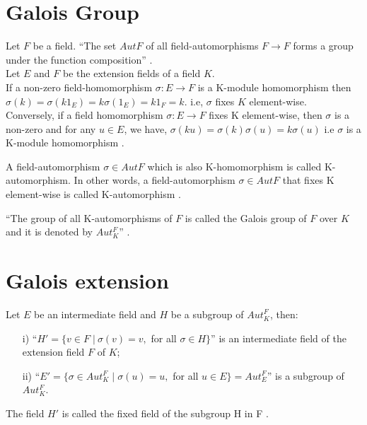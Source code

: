 \section{Galois Group}
Let \(F\) be a field. ``The set \(AutF\) of all field-automorphisms \(F \rightarrow F \) forms a group under the function composition'' \cite{hunger}.\\[3mm]
\noindent
Let \(E\) and \(F\) be the extension fields of a field \(K\).\\
If a non-zero field-homomorphism \(\sigma : E \rightarrow F\) is a K-module homomorphism then\\
\(\sigma(k)=\sigma(k1_E)=k\sigma(1_E)=k1_F=k\).\hspace{7mm}
i.e, \(\sigma\) fixes \(K\) element-wise.\\
Conversely, if a field homomorphism \(\sigma : E \rightarrow F\) fixes K element-wise, then \(\sigma\) is a non-zero and for any \(u \in E\), we have, \(\sigma(ku)=\sigma(k)\sigma(u)=k\sigma(u)\)
i.e \(\sigma\) is a K-module homomorphism \cite{hunger}.
\begin{definition}
  A field-automorphism \(\sigma \in Aut F\) which is also K-homomorphism is called K-automorphism. In other words, a field-automorphism \(\sigma \in Aut F\) that fixes K element-wise is called K-automorphism \cite{hunger}.
\end{definition}

\begin{definition}
  ``The group of all K-automorphisms of \(F\) is called the Galois group of \(F\) over \(K\) and it is denoted by \(Aut_K^F\)'' \cite{hunger}.
\end{definition}

\section{Galois extension}
Let \(E\) be an intermediate field and \(H\) be a subgroup of \(Aut_K^F\), then:
\begin{enumerate}
\item[i)] ``\(H' = \{v \in F \; | \: \sigma(v)=v,\) for all \(\sigma \in H \}\)'' \cite{hunger} is an intermediate field of the extension field \(F\) of \(K\);
\item[ii)] ``\(E' = \{\sigma \in Aut_K^F \; | \; \sigma(u)=u,\) for all \(u \in E\}=Aut_E^F\)'' \cite{hunger} is a subgroup of \(Aut_K^F\).
\end{enumerate}

The field \(H'\) is called the fixed field of the subgroup H in F \cite{hunger}.

